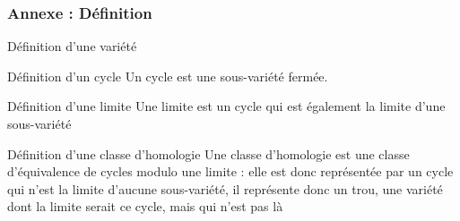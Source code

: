\documentclass{beamer}
\begin{document}
\appendix

\begin{frame}
    \frametitle{Annexe : Définition}
    \begin{block}{Définition d'une variété}
        
    \end{block}
    \begin{block}{Définition d'un cycle}
        Un cycle est une sous-variété fermée.
    \end{block}
    \begin{block}{Définition d'une limite}
        Une limite est un cycle qui est également la limite d'une
        sous-variété 
    \end{block}
    \begin{block}{Définition d'une classe d'homologie}
        Une classe d'homologie est une classe d'équivalence de 
        cycles modulo une limite : elle est donc représentée par un
        cycle qui n'est la limite d'aucune sous-variété, il représente 
        donc un trou, une variété dont la limite serait ce cycle, mais qui n'est pas là
    \end{block}
\end{frame}
\end{document}
